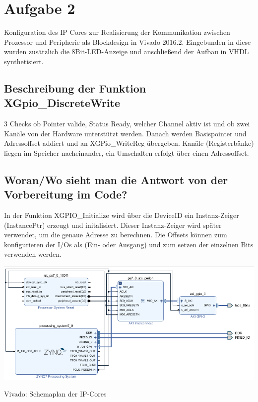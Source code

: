 \section{Aufgabe 2} \label{ex2}

Konfiguration des IP Cores zur Realisierung der Kommunikation zwischen Prozessor und 
Peripherie als Blockdesign in Vivado 2016.2. Eingebunden in diese wurden zusätzlich die 8Bit-LED-Anzeige und anschließend der Aufbau in VHDL synthetisiert.

\subsection{Beschreibung der Funktion XGpio\_DiscreteWrite}
3 Checks ob Pointer valide, Status Ready, welcher Channel aktiv ist und ob zwei Kanäle von der Hardware unterstützt werden. Danach werden Basispointer und Adressoffset addiert und an XGPio\_WriteReg übergeben. Kanäle (Registerbänke) liegen im Speicher nacheinander, ein Umschalten erfolgt über einen Adressoffset.\\

\subsection{Woran/Wo sieht man die Antwort von der Vorbereitung im Code?}
In der Funktion XGPIO\_Initialize wird über die DeviceID ein Instanz-Zeiger (InstancePtr) erzeugt und initalisiert. Dieser Instanz-Zeiger wird später verwendet, um die genaue Adresse zu berechnen. Die Offsets können zum konfigurieren der I/Os als (Ein- oder Ausgang) und zum setzen der einzelnen Bits verwenden werden.\\

\begin{minipage}{\textwidth}
    \begin{center}        
        \includegraphics[scale=0.7]{img/a2.png} 
    \end{center}
\end{minipage}
\begin{center}
Vivado: Schemaplan der IP-Cores
\end{center}



